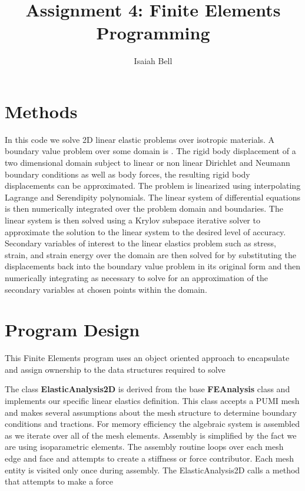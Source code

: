 \documentclass{article}
\begin{document}
\title{Assignment 4: Finite Elements Programming}
\author{Isaiah Bell} 
\maketitle

\section{Methods}

In this code we solve 2D linear elastic problems over isotropic materials. A boundary value problem over some domain is . The rigid body displacement of a two dimensional domain subject to linear or non linear Dirichlet and Neumann boundary conditions as well as body forces, the resulting rigid body displacements can be approximated. The problem is linearized using interpolating Lagrange and Serendipity polynomials. The linear system of differential equations is then numerically integrated over the problem domain and boundaries. The linear system is then solved using a Krylov subspace iterative solver to approximate the solution to the linear system to the desired level of accuracy. Secondary variables of interest to the linear elastics problem such as stress, strain, and strain energy over the domain are then solved for by substituting the displacements back into the boundary value problem in its original form and then numerically integrating as necessary to solve for an approximation of the secondary variables at chosen points within the domain.


\section{Program Design}
This Finite Elements program uses an object oriented approach to encapsulate and assign ownership to the data structures required to solve 

The class \textbf{ElasticAnalysis2D} is derived from the base \textbf{FEAnalysis} class and implements
our specific linear elastics definition. This class accepts a PUMI mesh and makes
several assumptions about the mesh structure to determine boundary conditions and
tractions. For memory efficiency the algebraic system is assembled as we iterate over all of the mesh elements. Assembly is simplified by the fact we are using isoparametric elements. The assembly routine loops over each mesh edge and face and attempts to create a stiffness or force contributor. Each mesh entity is visited only once during assembly. The ElasticAnalysis2D calls a method that attempts to make a force 
\end{document}
